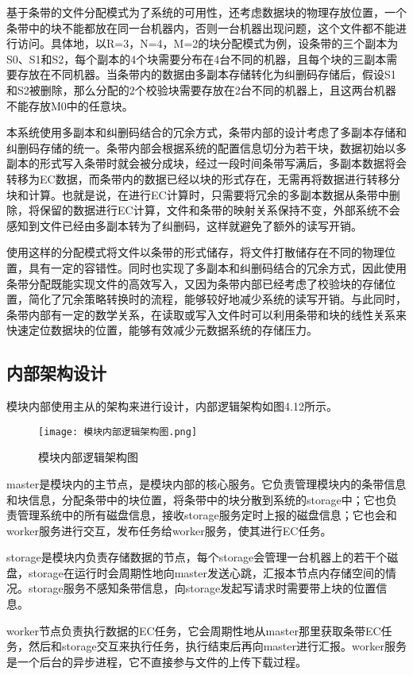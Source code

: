 基于条带的文件分配模式为了系统的可用性，还考虑数据块的物理存放位置，一个条带中的块不能都放在同一台机器内，否则一台机器出现问题，这个文件都不能进行访问。具体地，以R=3，N=4，M=2的块分配模式为例，设条带的三个副本为S0、S1和S2，每个副本的4个块需要分布在4台不同的机器，且每个块的三副本需要存放在不同机器。当条带内的数据由多副本存储转化为纠删码存储后，假设S1和S2被删除，那么分配的2个校验块需要存放在2台不同的机器上，且这两台机器不能存放M0中的任意块。

本系统使用多副本和纠删码结合的冗余方式，条带内部的设计考虑了多副本存储和纠删码存储的统一。条带内部会根据系统的配置信息切分为若干块，数据初始以多副本的形式写入条带时就会被分成块，经过一段时间条带写满后，多副本数据将会转移为EC数据，而条带内的数据已经以块的形式存在，无需再将数据进行转移分块和计算。也就是说，在进行EC计算时，只需要将冗余的多副本数据从条带中删除，将保留的数据进行EC计算，文件和条带的映射关系保持不变，外部系统不会感知到文件已经由多副本转为了纠删码，这样就避免了额外的读写开销。

使用这样的分配模式将文件以条带的形式储存，将文件打散储存在不同的物理位置，具有一定的容错性。同时也实现了多副本和纠删码结合的冗余方式，因此使用条带分配既能实现文件的高效写入，又因为条带内部已经考虑了校验块的存储位置，简化了冗余策略转换时的流程，能够较好地减少系统的读写开销。与此同时，条带内部有一定的数学关系，在读取或写入文件时可以利用条带和块的线性关系来快速定位数据块的位置，能够有效减少元数据系统的存储压力。

\subsection{内部架构设计}%
模块内部使用主从的架构来进行设计，内部逻辑架构如图4.12所示。

\begin{figure}[h]
  \centering
  \texttt{[image: 模块内部逻辑架构图.png]}
  \caption{模块内部逻辑架构图}
\end{figure}

master是模块内的主节点，是模块内部的核心服务。它负责管理模块内的条带信息和块信息，分配条带中的块位置，将条带中的块分散到系统的storage中；它也负责管理系统中的所有磁盘信息，接收storage服务定时上报的磁盘信息；它也会和worker服务进行交互，发布任务给worker服务，使其进行EC任务。

storage是模块内负责存储数据的节点，每个storage会管理一台机器上的若干个磁盘，storage在运行时会周期性地向master发送心跳，汇报本节点内存储空间的情况。storage服务不感知条带信息，向storage发起写请求时需要带上块的位置信息。

worker节点负责执行数据的EC任务，它会周期性地从master那里获取条带EC任务，然后和storage交互来执行任务，执行结束后再向master进行汇报。worker服务是一个后台的异步进程，它不直接参与文件的上传下载过程。

